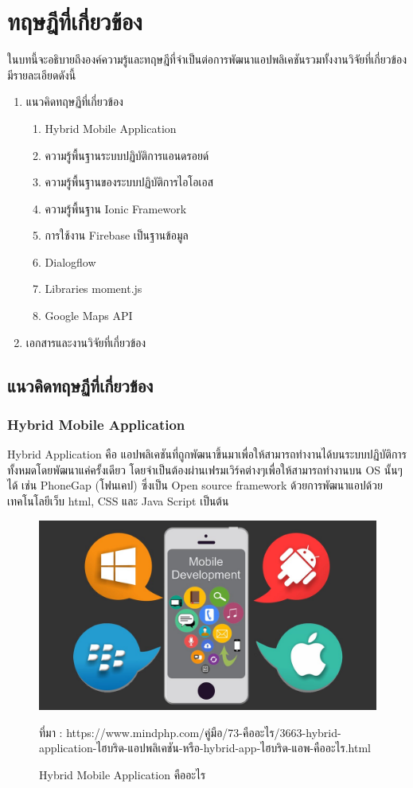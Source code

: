 \chapter{ทฤษฎีที่เกี่ยวข้อง}

ในบทนี้จะอธิบายถึงองค์ความรู้และทฤษฎีที่จำเป็นต่อการพัฒนาแอปพลิเคชันรวมทั้งงานวิจัยที่เกี่ยวข้อง มีรายละเอียดดังนี้

\begin{enumerate}[label=2.\arabic*]
	\item แนวคิดทฤษฏีที่เกี่ยวข้อง
	\begin{enumerate}[label=2.1.\arabic*]
		\item Hybrid Mobile Application
		\item ความรู้พื้นฐานระบบปฏิบัติการแอนดรอยด์
		\item ความรู้พื้นฐานของระบบปฏิบัติการไอโอเอส
		\item ความรู้พื้นฐาน Ionic Framework
		\item การใช้งาน Firebase เป็นฐานข้อมูล
		\item Dialogflow
		\item Libraries moment.js
		\item Google Maps API
	\end{enumerate}
	\item เอกสารและงานวิจัยที่เกี่ยวข้อง
\end{enumerate}

\section{แนวคิดทฤษฏีที่เกี่ยวข้อง}


\subsection{Hybrid Mobile Application}
Hybrid Application คือ แอปพลิเคชันที่ถูกพัฒนาขึ้นมาเพื่อให้สามารถทำงานได้บนระบบปฏิบัติการทั้งหมดโดยพัฒนาแค่ครั้งเดียว 
โดยจำเป็นต้องผ่านเฟรมเวิร์คต่างๆเพื่อให้สามารถทำงานบน OS นั้นๆได้ เช่น PhoneGap (โฟนเคป) ซึ่งเป็น Open source framework 
ด้วยการพัฒนาแอปด้วยเทคโนโลยีเว็บ html, CSS และ Java Script เป็นต้น 

\begin{figure}[H]
	\centering
	\includegraphics[width=0.5\columnwidth]{Figures/2/hybrid}
	\caption{Hybrid Mobile Application คืออะไร}{ที่มา :  https://www.mindphp.com/คู่มือ/73-คืออะไร/3663-hybrid-application-ไฮบริด-แอปพลิเคชัน-หรือ-hybrid-app-ไฮบริด-แอพ-คืออะไร.html}
	\label{Fig:hybrid}
\end{figure}

